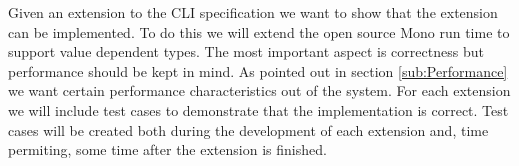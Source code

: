 \documentclass[english]{report}
\begin{document}
Given an extension to the CLI specification we want to show that the
extension can be implemented. To do this we will extend the open source
Mono run time to support value dependent types. The most important
aspect is correctness but performance should be kept in mind. As pointed
out in section \ref{sub:Performance} we want certain performance
characteristics out of the system. For each extension we will include
test cases to demonstrate that the implementation is correct. Test
cases will be created both during the development of each extension
and, time permiting, some time after the extension is finished.





\end{document}
